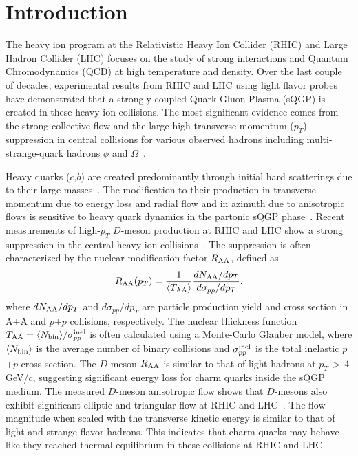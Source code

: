 \documentclass[%
 reprint,	
 amsmath,amssymb,
 aps,
 prc,
]{revtex4-1}
\begin{document}
\section{Introduction}
\label{introduction}

The heavy ion program at the Relativistic Heavy Ion Collider (RHIC) and Large Hadron Collider (LHC) focuses on the study of strong interactions and Quantum Chromodynamics (QCD) at high temperature and density. Over the last couple of decades, experimental results from RHIC and LHC using light flavor probes have demonstrated that a strongly-coupled Quark-Gluon Plasma (sQGP) is created in these heavy-ion collisions. The most significant evidence comes from the strong collective flow and the large high transverse momentum ($p_{T}$) suppression in central collisions for various observed hadrons including multi-strange-quark hadrons $\phi$ and $\Omega$~\cite{StarWhitePaper,PhenixWhitePaper,LhcSummary,Adamczyk:2015ukd,Abelev:2014pua}.

Heavy quarks ($c$,$b$) are created predominantly through initial hard scatterings due to their large masses~\cite{Ziwei_Lin,Cacciari}. The modification to their production in transverse momentum due to energy loss and radial flow and in azimuth due to anisotropic flows is sensitive to heavy quark dynamics in the partonic sQGP phase~\cite{Moore}. Recent measurements of high-$p_{T}$ $D$-meson production at RHIC and LHC show a strong suppression in the central heavy-ion collisions~\cite{Alice_D_RAA_1,Alice_D_RAA_2,CMS_D_RAA_5TeV,Star_D_RAA}. The suppression is often characterized by the nuclear modification factor $R_{\rm AA}$, defined as
\begin{equation}
  R_{\rm AA}(p_T) = \frac{1}{\langle T_{\rm AA}\rangle} \frac{dN_{\rm AA}/dp_{T}}{d\sigma_{pp}/dp_{T}}.
\label{equ:equation0}
\end{equation}
where $dN_{\rm AA}/dp_T$ and $d\sigma_{pp}/dp_T$ are particle production yield and cross section in A+A and $p$+$p$ collisions, respectively. The nuclear thickness function $T_{\rm AA}=\langle N_{\rm bin}\rangle/\sigma_{pp}^{\rm inel}$ is often calculated using a Monte-Carlo Glauber model, where $\langle N_{\rm bin}\rangle$ is the average number of binary collisions and $\sigma_{pp}^{\rm inel}$ is the total inelastic $p$+$p$ cross section.
The $D$-meson $R_{\rm AA}$ is similar to that of light hadrons at $p_{T}$$\,>$\,4\,GeV/$c$, suggesting significant energy loss for charm quarks inside the sQGP medium. The measured $D$-meson anisotropic flow shows that $D$-mesons also exhibit significant elliptic and triangular flow at RHIC and LHC~\cite{Alice_D_v2_276TeV_PRL,Alice_D_v2_276TeV_PRC,CMS_D_vn_5TeV,Star_D_v2}. The flow magnitude when scaled with the transverse kinetic energy is similar to that of light and strange flavor hadrons. This indicates that charm quarks may behave like they reached thermal equilibrium in these collisions at RHIC and LHC.
\end{document}
